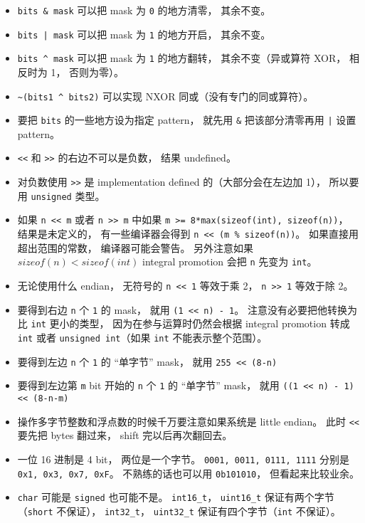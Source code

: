
\begin{issues}
\issueDraft
\end{issues}

\begin{itemize}
\item \verb|bits & mask| 可以把 mask 为 \verb|0| 的地方清零， 其余不变。
\item \verb`bits | mask` 可以把 mask 为 \verb|1| 的地方开启， 其余不变。
\item \verb|bits ^ mask| 可以把 mask 为 \verb|1| 的地方翻转， 其余不变（异或算符 XOR， 相反时为 1， 否则为零）。
\item \verb|~(bits1 ^ bits2)| 可以实现 NXOR 同或（没有专门的同或算符）。
\item 要把 \verb|bits| 的一些地方设为指定 pattern， 就先用 \verb|&| 把该部分清零再用 \verb`|` 设置 pattern。
\item \verb|<<| 和 \verb|>>| 的右边不可以是负数， 结果 undefined。
\item 对负数使用 \verb|>>| 是 implementation defined 的（大部分会在左边加 1）， 所以要用 \verb|unsigned| 类型。
\item 如果 \verb|n << m| 或者 \verb|n >> m| 中如果 \verb|m >= 8*max(sizeof(int), sizeof(n))|， 结果是未定义的， 有一些编译器会得到 \verb|n << (m % sizeof(n))|。 如果直接用超出范围的常数， 编译器可能会警告。 另外注意如果 $sizeof(n) < sizeof(int)$ integral promotion 会把 \verb|n| 先变为 \verb|int|。
\item 无论使用什么 endian， 无符号的 \verb|n << 1| 等效于乘 2， \verb|n >> 1| 等效于除 2。
\item 要得到右边 \verb|n| 个 \verb|1| 的 mask， 就用 \verb|(1 << n) - 1|。 注意没有必要把他转换为比 \verb|int| 更小的类型， 因为在参与运算时仍然会根据 integral promotion 转成 \verb|int| 或者 \verb|unsigned int|（如果 \verb|int| 不能表示整个范围）。
\item 要得到左边 \verb|n| 个 \verb|1| 的 “单字节” mask， 就用 \verb|255 << (8-n)|
\item 要得到左边第 \verb|m| bit 开始的 \verb|n| 个 \verb|1| 的 “单字节” mask， 就用 \verb|((1 << n) - 1) << (8-n-m)|
\item 操作多字节整数和浮点数的时候千万要注意如果系统是 little endian。 此时 \verb|<<| 要先把 bytes 翻过来， shift 完以后再次翻回去。
\item 一位 16 进制是 4 bit， 两位是一个字节。 \verb|0001, 0011, 0111, 1111| 分别是 \verb|0x1, 0x3, 0x7, 0xF|。 不熟练的话也可以用 \verb|0b101010|， 但看起来比较业余。
\item \verb|char| 可能是 \verb|signed| 也可能不是。 \verb|int16_t|， \verb|uint16_t| 保证有两个字节（\verb|short| 不保证）， \verb|int32_t|， \verb|uint32_t| 保证有四个字节（\verb|int| 不保证）。
\end{itemize}
